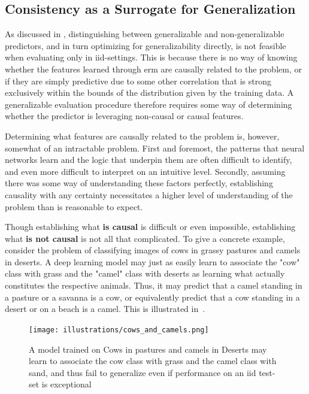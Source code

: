 \subsection{Consistency as a Surrogate for Generalization}\label{consistency_conceptual}
As discussed in , distinguishing between generalizable and non-generalizable predictors, and in turn optimizing for generalizability directly, is not feasible when evaluating only in iid-settings. This is because there is no way of knowing whether the features learned through \gls{erm} are causally related to the problem, or if they are simply predictive due to some other correlation that is strong exclusively within the bounds of the distribution given by the training data. A generalizable evaluation procedure therefore requires some way of determining whether the predictor is leveraging non-causal or causal features. 

Determining what features are causally related to the problem is, however, somewhat of an intractable problem. First and foremost, the patterns that neural networks learn and the logic that underpin them are often difficult to identify, and even more difficult to interpret on an intuitive level. Secondly, assuming there was some way of understanding these factors perfectly, establishing causality with any certainty necessitates a higher level of understanding of the problem than is reasonable to expect. 

Though establishing what \textbf{is causal} is difficult or even impossible, establishing what \textbf{is not causal} is not all that complicated. To give a concrete example, consider the problem of classifying images of cows in grassy pastures and camels in deserts. A deep learning model may just as easily learn to associate the "cow" class with grass and the "camel" class with deserts as learning what actually constitutes the respective animals. Thus, it may predict that a camel standing in a pasture or a savanna is a cow, or equivalently predict that a cow standing in a desert or on a beach is a camel. This is illustrated in~.

\begin{figure}[htb]
    \centering
    \texttt{[image: illustrations/cows\_and\_camels.png]}
    \caption[Cows and Camels Example]{A model trained on Cows in pastures and camels in Deserts may learn to associate the cow class with grass and the camel class with sand, and thus fail to generalize even if performance on an \gls{iid} test-set is exceptional}
    \label{fig:cows_and_camels}
\end{figure}

